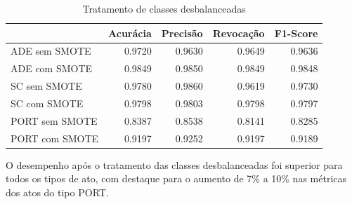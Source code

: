 \begin{table}[h]
\caption{Tratamento de classes desbalanceadas}
\label{tab:resultados-oversampling}
	\begin{center}
	\begin{tabular}{lrrrr}
		\toprule
		{} &  Acurácia &  Precisão &  Revocação &      F1-Score \\
		\midrule
		ADE sem SMOTE        &    0.9720 &    0.9630 &     0.9649 &  0.9636 \\
		ADE com SMOTE    &    0.9849 &    0.9850 &     0.9849 &  0.9848 \\
		SC sem SMOTE     &    0.9780 &    0.9860 &     0.9619 &  0.9730 \\
		SC com SMOTE &    0.9798 &    0.9803 &     0.9798 &  0.9797 \\
		PORT sem SMOTE     &    0.8387 &    0.8538 &     0.8141 &  0.8285 \\
		PORT com SMOTE &    0.9197 &    0.9252 &     0.9197 &  0.9189 \\
		\bottomrule
	\end{tabular}
	\end{center}		
\end{table}

O desempenho após o tratamento das classes desbalanceadas foi superior para todos os tipos de ato, com destaque para o aumento de 7\% a 10\% nas métricas dos atos do tipo PORT.   
